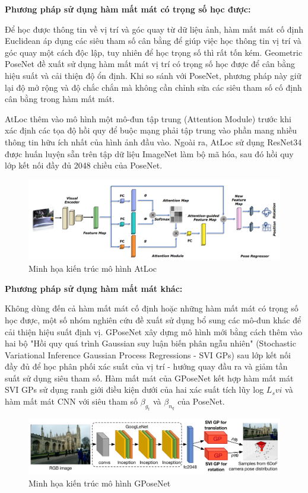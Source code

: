 \noindent\textbf{Phương pháp sử dụng hàm mất mát có trọng số học được:}

Để học được thông tin về vị trí và góc quay từ dữ liệu ảnh, hàm mất mát cố định Euclidean áp dụng các siêu tham số cân bằng để giúp việc học thông tin vị trí và góc quay một cách độc lập, tuy nhiên để học trọng số thì rất tốn kém. Geometric PoseNet \cite{kendall2017geometric} đề xuất sử dụng hàm mất mát vị trí có trọng số học được để cân bằng hiệu suất và cải thiện độ ổn định. Khi so sánh với PoseNet, phương pháp này giữ lại độ mở rộng và độ chắc chắn mà không cần chỉnh sửa các siêu tham số cố định cân bằng trong hàm mất mát.

AtLoc \cite{wang2019atloc} thêm vào mô hình một mô-đun tập trung (Attention Module) trước khi xác định các tọa độ hồi quy để  buộc mạng phải tập trung vào phần mang nhiều thông tin hữu ích nhất của hình ảnh đầu vào. Ngoài ra, AtLoc sử dụng ResNet34 được huấn luyện sẵn trên tập dữ liệu ImageNet làm bộ mã hóa, sau đó hồi quy lớp kết nối đầy đủ 2048 chiều của PoseNet.
\begin{figure}[H]
    \centering
    \includegraphics[width=\textwidth]{pics/Chapter2/atloc.png}
    \caption{Minh họa kiến trúc mô hình AtLoc \cite{wang2019atloc}}
\end{figure}

\noindent\textbf{Phương pháp sử dụng hàm mất mát khác:}

Không dùng đến cả hàm mất mát cố định hoặc những hàm mất mát có trọng số học được, một số nhóm nghiên cứu đề xuất sử dụng bổ sung các mô-đun khác để cải thiện hiệu suất định vị. GPoseNet \cite{Cai2018AHP} xây dựng mô hình mới bằng cách thêm vào hai bộ "Hồi quy quá trình Gaussian suy luận biến phân ngẫu nhiên" (Stochastic Variational Inference Gaussian Process Regressions - SVI GPs) sau lớp kết nối đầy đủ để học phân phối xác suất của vị trí - hướng quay đầu ra và giảm tần suất sử dụng siêu tham số. Hàm mất mát của GPoseNet kết hợp hàm mất mát SVI GPs sử dụng ranh giới điều kiện dưới của hai xác suất tích lũy log $L_{s}vi$ và hàm mất mát CNN với siêu tham số $\beta_{g_{t}}$ và $\beta_{n_{q}}$ của PoseNet.
\begin{figure}[H]
    \centering
    \includegraphics[width=\textwidth]{pics/Chapter2/gposenet.png}
    \caption{Minh họa kiến trúc mô hình GPoseNet \cite{kendall2017geometric}}
\end{figure}

